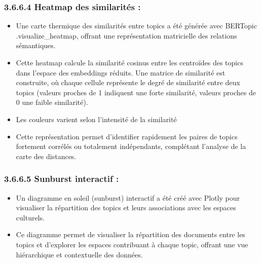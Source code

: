 \documentclass[mstat,12pt]{unswthesis}
\begin{document}
\bigskip

\subsubsection{3.6.6.4   Heatmap des similarités :}

\bigskip
\begin{itemize}
    \item 

    Une carte thermique des similarités entre topics a été générée avec BERTopic
    .visualize\_heatmap, offrant une représentation matricielle des relations sémantiques.

    \item

    Cette heatmap calcule la similarité cosinus entre les centroïdes des topics dans l’espace des embeddings réduits. Une matrice de similarité est construite, où chaque cellule représente le degré de similarité entre deux topics (valeurs proches de 1 indiquent une forte similarité, valeurs proches de 0 une faible similarité).

    \item

    Les couleurs varient selon l’intensité de la similarité

    \item

    Cette représentation permet d’identifier rapidement les paires de topics fortement corrélés ou totalement indépendants, complétant l’analyse de la carte des distances.
\end{itemize}

\bigskip

\subsubsection{3.6.6.5   Sunburst interactif :}

\bigskip

\begin{itemize}
    \item 

    Un diagramme en soleil (sunburst) interactif a été créé avec Plotly pour visualiser la répartition des topics et leurs associations avec les espaces culturels.
    
    \item

    Ce diagramme permet de visualiser la répartition des documents entre les topics et d’explorer les espaces contribuant à chaque topic, offrant une vue hiérarchique et contextuelle des données.
    
\end{itemize}
\end{document}
